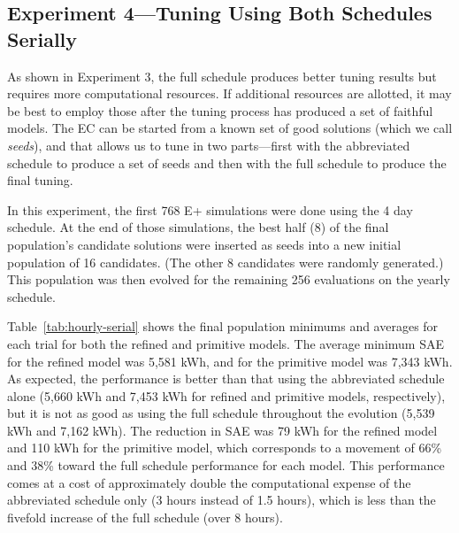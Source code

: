 \documentclass[preprint, review, 12pt]{elsarticle}
\begin{document}
\subsection{Experiment 4---Tuning Using Both Schedules Serially}
\label{sub:experiment4}
As shown in Experiment 3, the full schedule produces better tuning results but requires more computational resources. If additional resources are allotted, it may be best to employ those after the tuning process has produced a set of faithful models. The EC can be started from a known set of good solutions (which we call \emph{seeds}), and that allows us to tune in two parts---first with the abbreviated schedule to produce a set of seeds and then with the full schedule to produce the final tuning.

In this experiment, the first 768 E+ simulations were done using the 4 day schedule. At the end of those simulations, the best half (8) of the final population's candidate solutions were inserted as seeds into a new initial population of 16 candidates. (The other 8 candidates were randomly generated.) This population was then evolved for the remaining 256 evaluations on the yearly schedule.

Table~\ref{tab:hourly-serial} shows the final population minimums and averages for each trial for both the refined and primitive models. The average minimum SAE for the refined model was 5,581 kWh, and for the primitive model was 7,343 kWh. As expected, the performance is better than that using the abbreviated schedule alone (5,660 kWh and 7,453 kWh for refined and primitive models, respectively), but it is not as good as using the full schedule throughout the evolution (5,539 kWh and 7,162 kWh). The reduction in SAE was 79 kWh for the refined model and 110 kWh for the primitive model, which corresponds to a movement of 66\% and 38\% toward the full schedule performance for each model. This performance comes at a cost of approximately double the computational expense of the abbreviated schedule only (3 hours instead of 1.5 hours), which is less than the fivefold increase of the full schedule (over 8 hours). 
\end{document}
